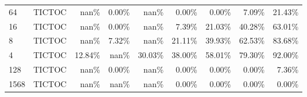 \begin{tabular}{llrrrrrrr}
64   & TICTOC &   nan\% &  0.00\% &   nan\% &  0.00\% &  0.00\% &  7.09\% & 21.43\% \\
16   & TICTOC &   nan\% &  0.00\% &   nan\% &  7.39\% & 21.03\% & 40.28\% & 63.01\% \\
8    & TICTOC &   nan\% &  7.32\% &   nan\% & 21.11\% & 39.93\% & 62.53\% & 83.68\% \\
4    & TICTOC & 12.84\% &   nan\% & 30.03\% & 38.00\% & 58.01\% & 79.30\% & 92.00\% \\
128  & TICTOC &   nan\% &  0.00\% &   nan\% &  0.00\% &  0.00\% &  0.00\% &  7.36\% \\
1568 & TICTOC &   nan\% &   nan\% &   nan\% &  0.00\% &  0.00\% &  0.00\% &  0.00\% \\
\bottomrule
\end{tabular}
